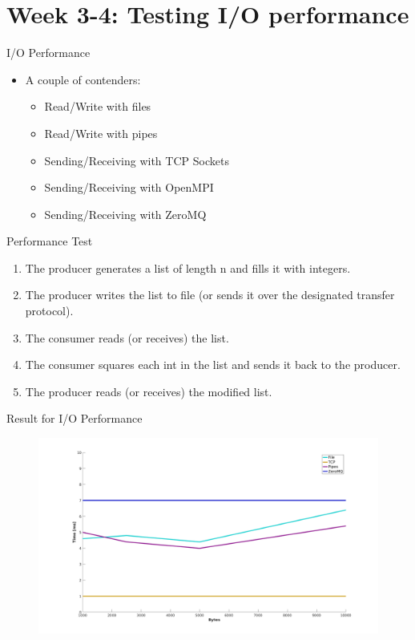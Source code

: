 \documentclass{beamer}
\begin{document}
    \section{Week 3-4: Testing I/O performance}

    \begin{frame}{I/O Performance}
    \begin{itemize}[<+-|alert@+>]
        \item A couple of contenders:
            \begin{itemize}
                \item Read/Write with files
                \item Read/Write with pipes
                \item Sending/Receiving with TCP Sockets
                \item Sending/Receiving with OpenMPI
                \item Sending/Receiving with ZeroMQ
            \end{itemize}
    \end{itemize}
    \end{frame}
    \begin{frame}{Performance Test}
        \begin{enumerate}[<+-|alert@+>]
            \item The producer generates a list of length n and fills it with
                  integers.
            \item The producer writes the list to file (or sends it over the
                  designated transfer protocol).
            \item The consumer reads (or receives) the list.
            \item The consumer squares each int in the list and sends it back
                  to the producer.
            \item The producer reads (or receives) the modified list.
        \end{enumerate}
    \end{frame}
    \begin{frame}{Result for I/O Performance}
    \begin{figure}[h!]
        \centering
        \includegraphics[width=1\columnwidth]{singlerun-nf}
    \end{figure}
    \end{frame}
\end{document}

